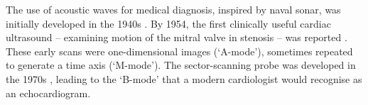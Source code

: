 The use of acoustic waves for medical diagnosis, inspired by naval sonar, was initially developed in the 1940s \cite{gagliardi_ultrasonography_1996}.  By 1954, the first clinically useful cardiac ultrasound -- examining motion of the mitral valve in stenosis -- was reported \cite{edler_ultrasonic_1957}.  These early scans were one-dimensional images (`A-mode'), sometimes repeated to generate a time axis (`M-mode').   The sector-scanning probe was developed in the 1970s \cite{bom_ultrasonic_1971,griffith_sector_1974}, leading to the `B-mode' that a modern cardiologist would recognise as an echocardiogram.
